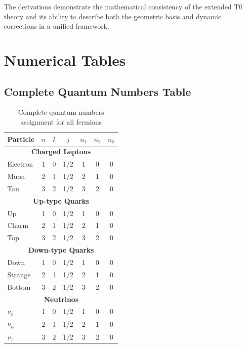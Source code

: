 	The derivations demonstrate the mathematical consistency of the extended T0 theory and its ability to describe both the geometric basis and dynamic corrections in a unified framework.
	
	\section{Numerical Tables}
	\label{app:tables}
	
	\subsection{Complete Quantum Numbers Table}
	
	\begin{table}[h]
		\centering
		\small
\begin{tabular}{lcccccc}
			\toprule
			\textbf{Particle} & \textbf{$n$} & \textbf{$l$} & \textbf{$j$} & \textbf{$n_1$} & \textbf{$n_2$} & \textbf{$n_3$} \\
			\midrule
			\multicolumn{7}{c}{\textbf{Charged Leptons}} \\
			\midrule
			Electron & 1 & 0 & 1/2 & 1 & 0 & 0 \\
			Muon & 2 & 1 & 1/2 & 2 & 1 & 0 \\
			Tau & 3 & 2 & 1/2 & 3 & 2 & 0 \\
			\midrule
			\multicolumn{7}{c}{\textbf{Up-type Quarks}} \\
			\midrule
			Up & 1 & 0 & 1/2 & 1 & 0 & 0 \\
			Charm & 2 & 1 & 1/2 & 2 & 1 & 0 \\
			Top & 3 & 2 & 1/2 & 3 & 2 & 0 \\
			\midrule
			\multicolumn{7}{c}{\textbf{Down-type Quarks}} \\
			\midrule
			Down & 1 & 0 & 1/2 & 1 & 0 & 0 \\
			Strange & 2 & 1 & 1/2 & 2 & 1 & 0 \\
			Bottom & 3 & 2 & 1/2 & 3 & 2 & 0 \\
			\midrule
			\multicolumn{7}{c}{\textbf{Neutrinos}} \\
			\midrule
			$\nu_e$ & 1 & 0 & 1/2 & 1 & 0 & 0 \\
			$\nu_\mu$ & 2 & 1 & 1/2 & 2 & 1 & 0 \\
			$\nu_\tau$ & 3 & 2 & 1/2 & 3 & 2 & 0 \\
			\bottomrule
		\end{tabular}
		\caption{Complete quantum numbers assignment for all fermions}
		\label{tab:all_quantum_numbers}
	\end{table}
	
